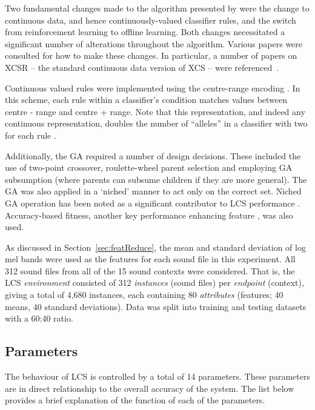 \documentclass[11pt]{article}
\begin{document}
Two fundamental changes made to the algorithm presented by \citeauthor{Butz2000} were the change to continuous data, and hence continuously-valued classifier rules, and the switch from reinforcement learning to offline learning. Both changes necessitated a significant number of alterations throughout the algorithm. Various papers were consulted for how to make these changes. In particular, a number of papers on XCSR -- the standard continuous data version of XCS -- were referenced~\cite{Sowden2007,Stone2003,Wilson2000,Behdad2012}.

Continuous valued rules were implemented using the centre-range encoding \cite{Sowden2007}. In this scheme, each rule within a classifier's condition matches values between centre - range and centre + range. Note that this representation, and indeed any continuous representation, doubles the number of ``alleles'' in a classifier with two for each rule \cite{Sowden2007}.

Additionally, the GA required a number of design decisions. These included the use of two-point crossover, roulette-wheel parent selection and employing GA subsumption (where parents can subsume children if they are more general). The GA was also applied in a `niched' manner to act only on the correct set. Niched GA operation has been noted as a significant contributor to LCS performance \cite{Lanzi2008}. Accuracy-based fitness, another key performance enhancing feature \cite{Lanzi2008}, was also used.

As discussed in Section~\ref{sec:featReduce}, the mean and standard deviation of log mel bands were used as the features for each sound file in this experiment. All 312 sound files from all of the 15 sound contexts were considered. That is, the LCS \textit{environment} consisted of 312 \textit{instances} (sound files) per \textit{endpoint} (context), giving a total of 4,680 instances, each containing 80 \textit{attributes} (features; 40 means, 40 standard deviations). Data was split into training and testing datasets with a 60:40 ratio.

\subsection{Parameters}
\label{sec:exp2params}

The behaviour of LCS is controlled by a total of 14 parameters. These parameters are in direct relationship to the overall accuracy of the system. The list below provides a brief explanation of the function of each of the parameters.
\end{document}
